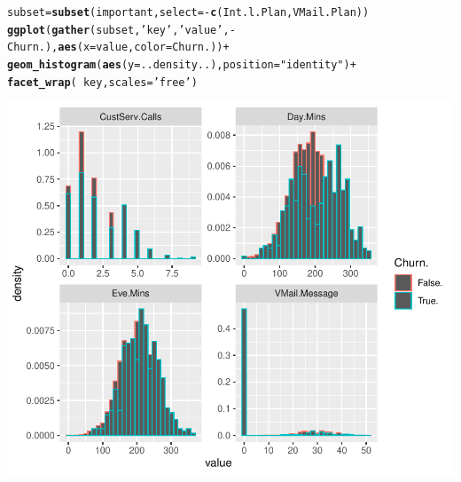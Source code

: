 \documentclass{article}\usepackage[]{graphicx}\usepackage[]{color}
\makeatletter
\def\maxwidth{ %
  \ifdim\Gin@nat@width>\linewidth
    \linewidth
  \else
    \Gin@nat@width
  \fi
}
\newcommand{\hlstr}[1]{\textcolor[rgb]{0.192,0.494,0.8}{#1}}%
\newcommand{\hlopt}[1]{\textcolor[rgb]{0,0,0}{#1}}%
\newcommand{\hlstd}[1]{\textcolor[rgb]{0.345,0.345,0.345}{#1}}%
\newcommand{\hlkwb}[1]{\textcolor[rgb]{0.69,0.353,0.396}{#1}}%
\newcommand{\hlkwc}[1]{\textcolor[rgb]{0.333,0.667,0.333}{#1}}%
\newcommand{\hlkwd}[1]{\textcolor[rgb]{0.737,0.353,0.396}{\textbf{#1}}}%
\newenvironment{kframe}{%
 \def\at@end@of@kframe{}%
 \ifinner\ifhmode%
  \def\at@end@of@kframe{\end{minipage}}%
  \begin{minipage}{\columnwidth}%
 \fi\fi%
 \def\FrameCommand##1{\hskip\@totalleftmargin \hskip-\fboxsep
 \colorbox{shadecolor}{##1}\hskip-\fboxsep
     \hskip-\linewidth \hskip-\@totalleftmargin \hskip\columnwidth}%
 \MakeFramed {\advance\hsize-\width
   \@totalleftmargin\z@ \linewidth\hsize
   \@setminipage}}%
 {\par\unskip\endMakeFramed%
 \at@end@of@kframe}
\newenvironment{knitrout}{}{} %
\makeatother
\begin{document}
\begin{knitrout}
\begin{table}[!h]

\caption{\label{tab:sumaryczne dla grup}VMail.Message}
\centering
{}
\end{table}


\end{knitrout}

\begin{knitrout}
\color{fgcolor}\begin{kframe}
\begin{alltt}
\hlstd{subset} \hlkwb{=} \hlkwd{subset}\hlstd{(important,} \hlkwc{select}\hlstd{=}\hlopt{-}\hlkwd{c}\hlstd{(Int.l.Plan, VMail.Plan))}
\hlkwd{ggplot}\hlstd{(}\hlkwd{gather}\hlstd{(subset,} \hlstr{'key'}\hlstd{,} \hlstr{'value'}\hlstd{,} \hlopt{-}\hlstd{Churn.),} \hlkwd{aes}\hlstd{(}\hlkwc{x}\hlstd{=value,} \hlkwc{color}\hlstd{=Churn.))} \hlopt{+}
  \hlkwd{geom_histogram}\hlstd{(}\hlkwd{aes}\hlstd{(}\hlkwc{y}\hlstd{=..density..),} \hlkwc{position}\hlstd{=}\hlstr{"identity"}\hlstd{)} \hlopt{+}
  \hlkwd{facet_wrap}\hlstd{(}\hlopt{~}\hlstd{key,} \hlkwc{scales}\hlstd{=}\hlstr{'free'}\hlstd{)}
\end{alltt}
\end{kframe}

{\centering \includegraphics[width=\maxwidth]{figure/histogramy_dla_grup-1} 

}



\end{knitrout}
\end{document}
